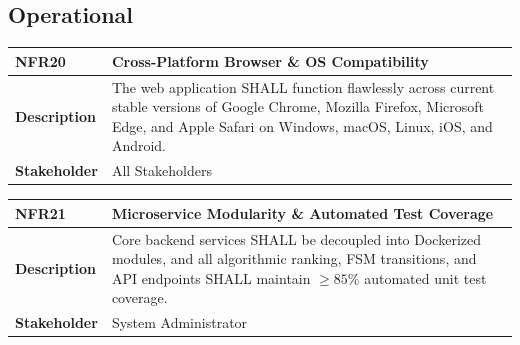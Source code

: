 \subsection{Operational}
\label{subsec:nfr_operational}

\begin{table}[H]
\centering
\small
\begin{tabularx}{\textwidth}{|l|X|}
\hline
\rowcolor{lightgray!40} \textbf{NFR20} & \textbf{Cross-Platform Browser \& OS Compatibility} \\ \hline
\textbf{Description} & The web application SHALL function flawlessly across current stable versions of Google Chrome, Mozilla Firefox, Microsoft Edge, and Apple Safari on Windows, macOS, Linux, iOS, and Android. \\ \hline
\textbf{Stakeholder} & All Stakeholders \\ \hline
\end{tabularx}
\end{table}

\begin{table}[H]
\centering
\small
\begin{tabularx}{\textwidth}{|l|X|}
\hline
\rowcolor{lightgray!40} \textbf{NFR21} & \textbf{Microservice Modularity \& Automated Test Coverage} \\ \hline
\textbf{Description} & Core backend services SHALL be decoupled into Dockerized modules, and all algorithmic ranking, FSM transitions, and API endpoints SHALL maintain $\ge 85\%$ automated unit test coverage. \\ \hline
\textbf{Stakeholder} & System Administrator \\ \hline
\end{tabularx}
\end{table}


